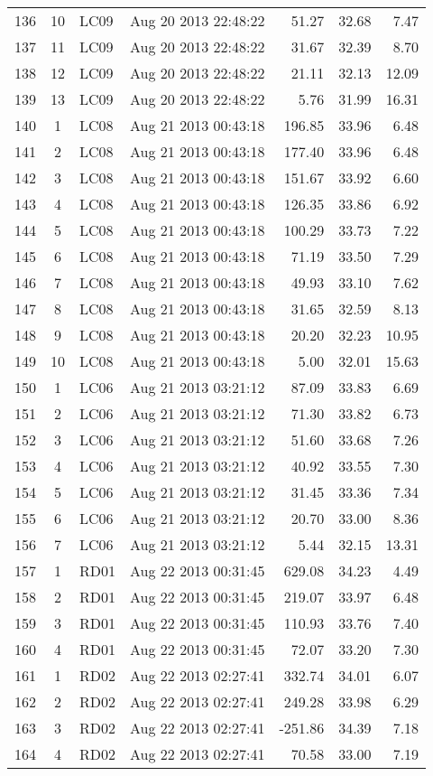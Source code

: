 \begin{longtable}{ccllrrr}
136&10&LC09&Aug 20 2013 22:48:22&51.27&32.68&7.47\\
137&11&LC09&Aug 20 2013 22:48:22&31.67&32.39&8.70\\
138&12&LC09&Aug 20 2013 22:48:22&21.11&32.13&12.09\\
139&13&LC09&Aug 20 2013 22:48:22&5.76&31.99&16.31\\
\hline 
140&1&LC08&Aug 21 2013 00:43:18&196.85&33.96&6.48\\
141&2&LC08&Aug 21 2013 00:43:18&177.40&33.96&6.48\\
142&3&LC08&Aug 21 2013 00:43:18&151.67&33.92&6.60\\
143&4&LC08&Aug 21 2013 00:43:18&126.35&33.86&6.92\\
144&5&LC08&Aug 21 2013 00:43:18&100.29&33.73&7.22\\
145&6&LC08&Aug 21 2013 00:43:18&71.19&33.50&7.29\\
146&7&LC08&Aug 21 2013 00:43:18&49.93&33.10&7.62\\
147&8&LC08&Aug 21 2013 00:43:18&31.65&32.59&8.13\\
148&9&LC08&Aug 21 2013 00:43:18&20.20&32.23&10.95\\
149&10&LC08&Aug 21 2013 00:43:18&5.00&32.01&15.63\\
\hline 
150&1&LC06&Aug 21 2013 03:21:12&87.09&33.83&6.69\\
151&2&LC06&Aug 21 2013 03:21:12&71.30&33.82&6.73\\
152&3&LC06&Aug 21 2013 03:21:12&51.60&33.68&7.26\\
153&4&LC06&Aug 21 2013 03:21:12&40.92&33.55&7.30\\
154&5&LC06&Aug 21 2013 03:21:12&31.45&33.36&7.34\\
155&6&LC06&Aug 21 2013 03:21:12&20.70&33.00&8.36\\
156&7&LC06&Aug 21 2013 03:21:12&5.44&32.15&13.31\\
\hline 
157&1&RD01&Aug 22 2013 00:31:45&629.08&34.23&4.49\\
158&2&RD01&Aug 22 2013 00:31:45&219.07&33.97&6.48\\
159&3&RD01&Aug 22 2013 00:31:45&110.93&33.76&7.40\\
160&4&RD01&Aug 22 2013 00:31:45&72.07&33.20&7.30\\
\hline 
161&1&RD02&Aug 22 2013 02:27:41&332.74&34.01&6.07\\
162&2&RD02&Aug 22 2013 02:27:41&249.28&33.98&6.29\\
163&3&RD02&Aug 22 2013 02:27:41&-251.86&34.39&7.18\\
164&4&RD02&Aug 22 2013 02:27:41&70.58&33.00&7.19\\

\end{longtable}
